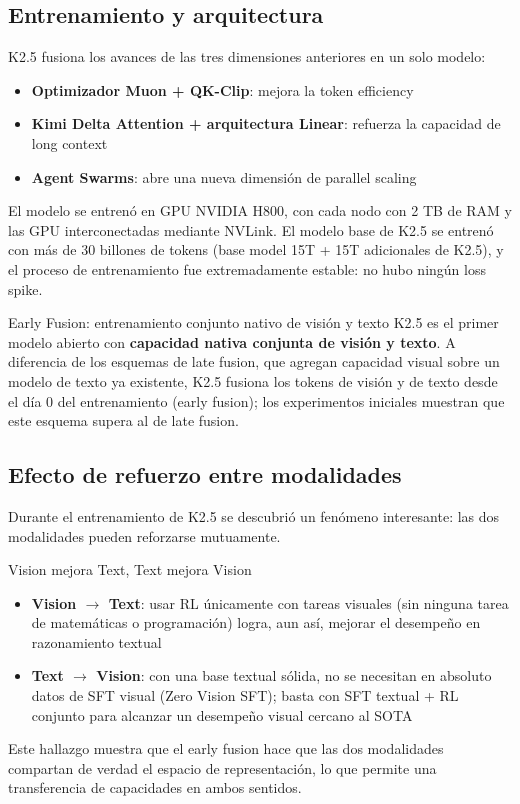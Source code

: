 \documentclass[a4paper]{article}
\begin{document}
\subsection{Entrenamiento y arquitectura}

K2.5 fusiona los avances de las tres dimensiones anteriores en un solo modelo:
\begin{itemize}
    \item \textbf{Optimizador Muon + QK-Clip}: mejora la token efficiency
    \item \textbf{Kimi Delta Attention + arquitectura Linear}: refuerza la capacidad de long context
    \item \textbf{Agent Swarms}: abre una nueva dimensión de parallel scaling
\end{itemize}

El modelo se entrenó en GPU NVIDIA H800, con cada nodo con 2 TB de RAM y las GPU interconectadas mediante NVLink. El modelo base de K2.5 se entrenó con más de 30 billones de tokens (base model 15T + 15T adicionales de K2.5), y el proceso de entrenamiento fue extremadamente estable: no hubo ningún loss spike.

\begin{importantbox}{Early Fusion: entrenamiento conjunto nativo de visión y texto}
K2.5 es el primer modelo abierto con \textbf{capacidad nativa conjunta de visión y texto}. A diferencia de los esquemas de late fusion, que agregan capacidad visual sobre un modelo de texto ya existente, K2.5 fusiona los tokens de visión y de texto desde el día 0 del entrenamiento (early fusion); los experimentos iniciales muestran que este esquema supera al de late fusion.
\end{importantbox}

\subsection{Efecto de refuerzo entre modalidades}

Durante el entrenamiento de K2.5 se descubrió un fenómeno interesante: las dos modalidades pueden reforzarse mutuamente.

\begin{importantbox}{Vision mejora Text, Text mejora Vision}
\begin{itemize}
    \item \textbf{Vision $\rightarrow$ Text}: usar RL únicamente con tareas visuales (sin ninguna tarea de matemáticas o programación) logra, aun así, mejorar el desempeño en razonamiento textual
    \item \textbf{Text $\rightarrow$ Vision}: con una base textual sólida, no se necesitan en absoluto datos de SFT visual (Zero Vision SFT); basta con SFT textual + RL conjunto para alcanzar un desempeño visual cercano al SOTA
\end{itemize}
Este hallazgo muestra que el early fusion hace que las dos modalidades compartan de verdad el espacio de representación, lo que permite una transferencia de capacidades en ambos sentidos.
\end{importantbox}
\end{document}
